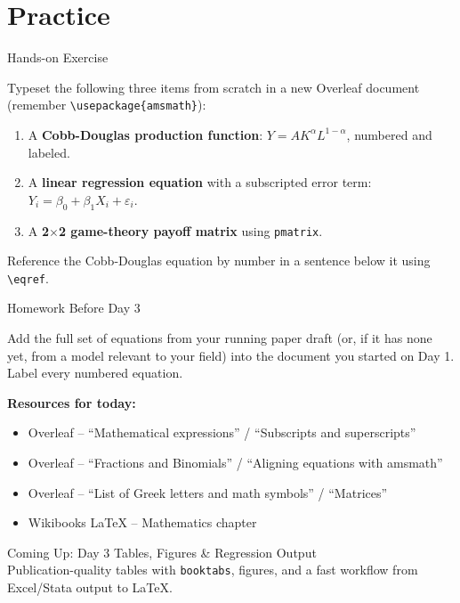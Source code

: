 \documentclass[11pt,aspectratio=169]{beamer}
\begin{document}
\section{Practice}

\begin{frame}{Hands-on Exercise}
  \begin{exercisebox}
    Typeset the following three items from scratch in a new Overleaf
    document (remember \texttt{\textbackslash usepackage\{amsmath\}}):
    \begin{enumerate}
      \item A \textbf{Cobb-Douglas production function}:
        $Y = AK^{\alpha}L^{1-\alpha}$, numbered and labeled.
      \item A \textbf{linear regression equation} with a subscripted
        error term: $Y_i = \beta_0 + \beta_1 X_i + \varepsilon_i$.
      \item A \textbf{2$\times$2 game-theory payoff matrix} using
        \texttt{pmatrix}.
    \end{enumerate}
    Reference the Cobb-Douglas equation by number in a sentence below
    it using \texttt{\textbackslash eqref}.
  \end{exercisebox}
\end{frame}

\begin{frame}{Homework Before Day 3}
  \begin{homeworkbox}
    Add the full set of equations from your running paper draft (or,
    if it has none yet, from a model relevant to your field) into the
    document you started on Day 1. Label every numbered equation.
  \end{homeworkbox}
  \vspace{10pt}
  \small\textbf{Resources for today:}
  \begin{itemize}\small
    \item Overleaf -- ``Mathematical expressions'' / ``Subscripts and superscripts''
    \item Overleaf -- ``Fractions and Binomials'' / ``Aligning equations with amsmath''
    \item Overleaf -- ``List of Greek letters and math symbols'' / ``Matrices''
    \item Wikibooks LaTeX -- Mathematics chapter
  \end{itemize}
\end{frame}

\begin{frame}{Coming Up: Day 3}
  \Large
  \centering
  Tables, Figures \& Regression Output \\[6pt]
  \normalsize
  Publication-quality tables with \texttt{booktabs}, figures, and a
  fast workflow from Excel/Stata output to LaTeX.
\end{frame}
\end{document}
